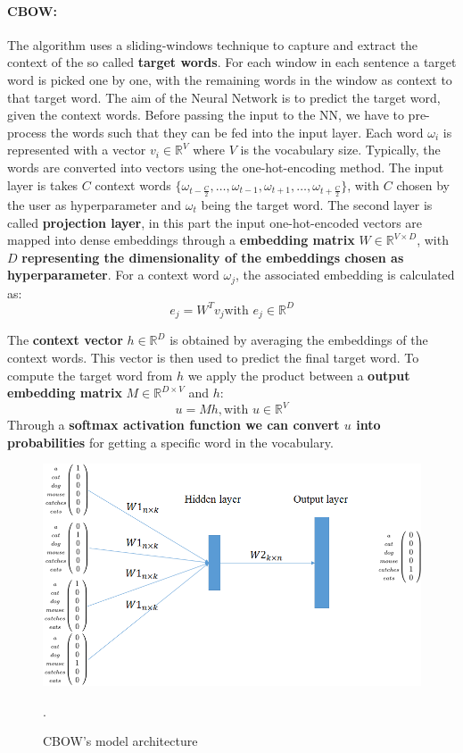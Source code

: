 \documentclass[12pt]{article}
\begin{document}
\paragraph*{CBOW:} The algorithm uses a sliding-windows technique to capture and extract the context of the so 
called \textbf{target words}. For each window in each sentence a target word is picked one by one, 
with the remaining words in the window as context to that target word. The aim of the Neural Network is to 
predict the target word, given the context words. Before passing the input to the NN, we have to pre-process the 
words such that they can be fed into the input layer. Each word $\omega_i$ is represented with a vector 
$v_i \in \mathbb{R}^{V}$ where $V$ is the vocabulary size. Typically, the words are converted into vectors using 
the one-hot-encoding method. The input layer is takes $C$ context words $\{\omega_{t-\frac{C}{2}}, \ldots, \omega_{t-1}, 
\omega_{t+1}, \ldots, \omega_{t+\frac{C}{2}}\}$, with $C$ chosen by the user as hyperparameter and $\omega_t$ being the 
target word. The second layer is called \textbf{projection layer}, in this part the input one-hot-encoded 
vectors are mapped into dense embeddings through a \textbf{embedding matrix} $W \in \mathbb{R}^{V \times D}$, with 
$D$ \textbf{representing the dimensionality of the embeddings chosen as hyperparameter}. For a context word $\omega_j$, the associated 
embedding is calculated as:
\begin{equation} 
    e_j = W^T v_j \text{with } e_j \in \mathbb{R}^{D}
\end{equation}

The \textbf{context vector} $h \in \mathbb{R}^{D}$ is obtained by averaging the embeddings of the context words. This vector is then 
used to predict the final target word. To compute the target word from $h$ we apply the product between a 
\textbf{output embedding matrix} $M \in \mathbb{R}^{D \times V}$ and $h$:
\begin{equation}
    u = M h, \text{with } u \in \mathbb{R}^{V}
\end{equation} 
Through a \textbf{softmax activation function we can convert $u$ into probabilities} for getting a specific word in the 
vocabulary.

\begin{figure}
    \centering
    \includegraphics[width=.7\textwidth]{Images/cbow.png}
    \caption{CBOW's model architecture}.
    \label{fig:cbow}
\end{figure}
\end{document}
